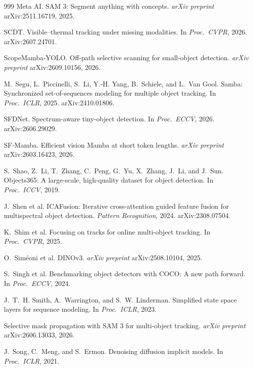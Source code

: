 \begin{thebibliography}{999}
Meta AI.
SAM 3: Segment anything with concepts.
\textit{arXiv preprint} arXiv:2511.16719, 2025.

SCDT. Visible--thermal tracking under missing modalities.
In \textit{Proc.\ CVPR}, 2026. arXiv:2607.24701.

ScopeMamba-YOLO. Off-path selective scanning for small-object detection.
\textit{arXiv preprint} arXiv:2609.10156, 2026.

M.~Segu, L.~Piccinelli, S.~Li, Y.-H. Yang, B.~Schiele, and L.~Van Gool.
Samba: Synchronized set-of-sequences modeling for multiple object tracking.
In \textit{Proc.\ ICLR}, 2025. arXiv:2410.01806.

SFDNet. Spectrum-aware tiny-object detection.
In \textit{Proc.\ ECCV}, 2026. arXiv:2606.29029.

SF-Mamba. Efficient vision Mamba at short token lengths.
\textit{arXiv preprint} arXiv:2603.16423, 2026.

S.~Shao, Z.~Li, T.~Zhang, C.~Peng, G.~Yu, X.~Zhang, J.~Li, and J.~Sun.
Objects365: A large-scale, high-quality dataset for object detection.
In \textit{Proc.\ ICCV}, 2019.

J.~Shen et al.
ICAFusion: Iterative cross-attention guided feature fusion for multispectral
object detection. \textit{Pattern Recognition}, 2024. arXiv:2308.07504.

K.~Shim et al.
Focusing on tracks for online multi-object tracking.
In \textit{Proc.\ CVPR}, 2025.

O.~Sim\'eoni et al.
DINOv3. \textit{arXiv preprint} arXiv:2508.10104, 2025.

S.~Singh et al.
Benchmarking object detectors with COCO: A new path forward.
In \textit{Proc.\ ECCV}, 2024.

J.~T.~H. Smith, A.~Warrington, and S.~W. Linderman.
Simplified state space layers for sequence modeling.
In \textit{Proc.\ ICLR}, 2023.

Selective mask propagation with SAM 3 for multi-object tracking.
\textit{arXiv preprint} arXiv:2606.13033, 2026.

J.~Song, C.~Meng, and S.~Ermon.
Denoising diffusion implicit models.
In \textit{Proc.\ ICLR}, 2021.


\end{thebibliography}
